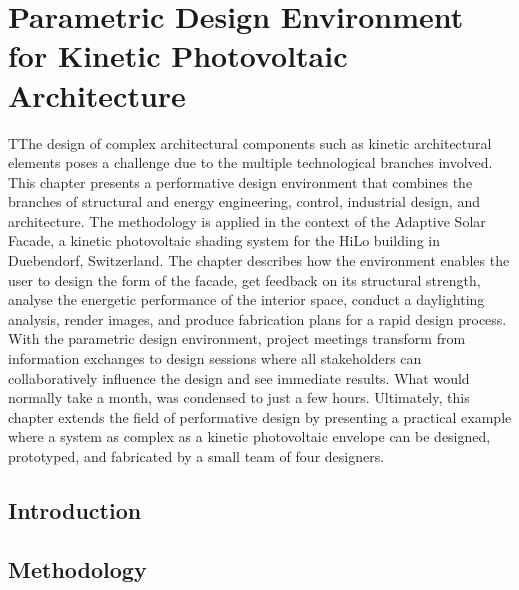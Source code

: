 
\chapter{Parametric Design Environment for Kinetic Photovoltaic Architecture}
\label{ch:asfDesign}


\begin{chapterabstract}
TThe design of complex architectural components such as kinetic architectural elements poses a challenge due to the multiple technological branches involved. This chapter presents a performative design environment that combines the branches of structural and energy engineering, control, industrial design, and architecture. The methodology is applied in the context of the Adaptive Solar Facade, a kinetic photovoltaic shading system for the HiLo building in Duebendorf, Switzerland. The chapter describes how the environment enables the user to design the form of the facade, get feedback on its structural strength, analyse the energetic performance of the interior space, conduct a daylighting analysis, render images, and produce fabrication plans for a rapid design process. With the parametric design environment, project meetings transform from information exchanges to design sessions where all stakeholders can collaboratively influence the design and see immediate results. What would normally take a month, was condensed to just a few hours. Ultimately, this chapter extends the field of performative design by presenting a practical example where a system as complex as a kinetic photovoltaic envelope can be designed, prototyped, and fabricated by a small team of four designers. 
\end{chapterabstract}


\newpage

\graphicspath{{chapters/ch1asfDesign//Images/}}

\section{Introduction}
\label{ch:introduction1}


\section{Methodology}
\label{ch:method1}


